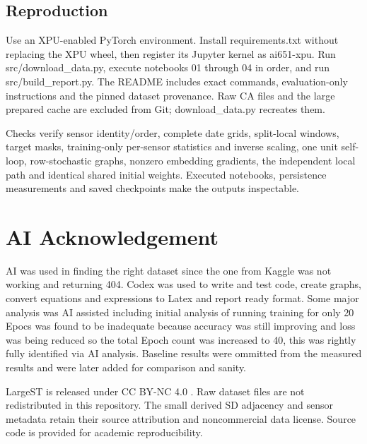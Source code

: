 \documentclass[11pt,a4paper]{article}
\begin{document}
\subsection{Reproduction}

Use an XPU-enabled PyTorch environment. Install requirements.txt without replacing the XPU wheel, then register its Jupyter kernel as ai651-xpu. Run src/download\_data.py, execute notebooks 01 through 04 in order, and run src/build\_report.py. The README includes exact commands, evaluation-only instructions and the pinned dataset provenance. Raw CA files and the large prepared cache are excluded from Git; download\_data.py recreates them.


Checks verify sensor identity/order, complete date grids, split-local windows, target masks, training-only per-sensor statistics and inverse scaling, one unit self-loop, row-stochastic graphs, nonzero embedding gradients, the independent local path and identical shared initial weights. Executed notebooks, persistence measurements and saved checkpoints make the outputs inspectable.


\FloatBarrier\appendix\section{AI Acknowledgement}
AI was used in finding the right dataset since the one from Kaggle was not working and returning 404. Codex was used to write and test code, create graphs, convert equations and expressions to Latex and report ready format. Some major analysis was AI assisted including initial analysis of running training for only 20 Epocs was found to be inadequate because accuracy was still improving and loss was being reduced so the total Epoch count was increased to 40, this was rightly fully identified via AI analysis. Baseline results were ommitted from the measured results and were later added for comparison and sanity.


LargeST is released under CC BY-NC 4.0 \cite{largest-repo}. Raw dataset files are not redistributed in this repository. The small derived SD adjacency and sensor metadata retain their source attribution and noncommercial data license. Source code is provided for academic reproducibility.
\end{document}
